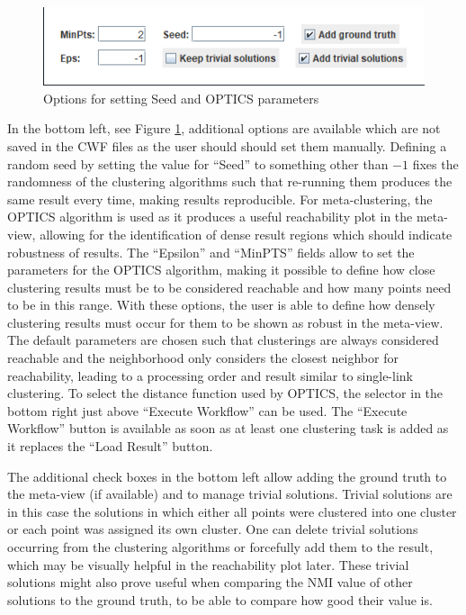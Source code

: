 \documentclass[
	a4paper,
	english,
	twoside,
	openright,               
	11pt                            
	]{report}
\begin{document}
\begin{figure}[h]
	\centering
	\includegraphics[scale=.75]{workflow-options}
	\caption{Options for setting Seed and OPTICS parameters}
	\label{fig:workflow-options}
\end{figure}

In the bottom left, see Figure \ref{fig:workflow-options}, additional options are available which are not saved in the CWF files as the user should should set them manually. Defining a random seed by setting the value for ``Seed'' to something other than $-1$ fixes the randomness of the clustering algorithms such that re-running them produces the same result every time, making results reproducible. For meta-clustering, the OPTICS \cite{10.1145/304181.304187} algorithm is used as it produces a useful reachability plot in the meta-view, allowing for the identification of dense result regions which should indicate robustness of results. The ``Epsilon'' and ``MinPTS'' fields allow to set the parameters for the OPTICS algorithm, making it possible to define how close clustering results must be to be considered reachable and how many points need to be in this range. With these options, the user is able to define how densely clustering results must occur for them to be shown as robust in the meta-view. The default parameters are chosen such that clusterings are always considered reachable and the neighborhood only considers the closest neighbor for reachability, leading to a processing order and result similar to single-link clustering. To select the distance function used by OPTICS, the selector in the bottom right just above ``Execute Workflow'' can be used. The ``Execute Workflow'' button is available as soon as at least one clustering task is added as it replaces the ``Load Result'' button.

The additional check boxes in the bottom left allow adding the ground truth to the meta-view (if available) and to manage trivial solutions. Trivial solutions are in this case the solutions in which either all points were clustered into one cluster or each point was assigned its own cluster. One can delete trivial solutions occurring from the clustering algorithms or forcefully add them to the result, which may be visually helpful in the reachability plot later. These trivial solutions might also prove useful when comparing the NMI value of other solutions to the ground truth, to be able to compare how good their value is.
\end{document}

